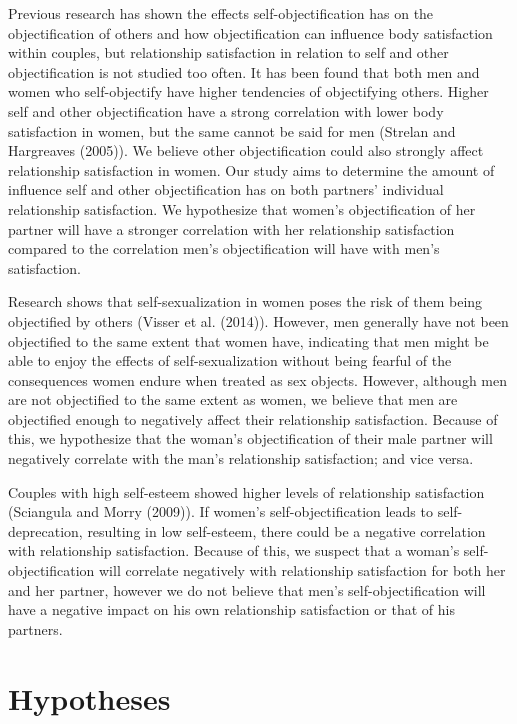 \documentclass[
  english,
  man]{apa6}
\begin{document}
Previous research has shown the effects self-objectification has on the objectification of others and how objectification can influence body satisfaction within couples, but relationship satisfaction in relation to self and other objectification is not studied too often. It has been found that both men and women who self-objectify have higher tendencies of objectifying others. Higher self and other objectification have a strong correlation with lower body satisfaction in women, but the same cannot be said for men (Strelan and Hargreaves (2005)). We believe other objectification could also strongly affect relationship satisfaction in women. Our study aims to determine the amount of influence self and other objectification has on both partners' individual relationship satisfaction. We hypothesize that women's objectification of her partner will have a stronger correlation with her relationship satisfaction compared to the correlation men's objectification will have with men's satisfaction.

Research shows that self-sexualization in women poses the risk of them being objectified by others (Visser et al. (2014)). However, men generally have not been objectified to the same extent that women have, indicating that men might be able to enjoy the effects of self-sexualization without being fearful of the consequences women endure when treated as sex objects. However, although men are not objectified to the same extent as women, we believe that men are objectified enough to negatively affect their relationship satisfaction. Because of this, we hypothesize that the woman's objectification of their male partner will negatively correlate with the man's relationship satisfaction; and vice versa.

Couples with high self-esteem showed higher levels of relationship satisfaction (Sciangula and Morry (2009)). If women's self-objectification leads to self-deprecation, resulting in low self-esteem, there could be a negative correlation with relationship satisfaction. Because of this, we suspect that a woman's self-objectification will correlate negatively with relationship satisfaction for both her and her partner, however we do not believe that men's self-objectification will have a negative impact on his own relationship satisfaction or that of his partners.

\hypertarget{hypotheses}{%
\section{Hypotheses}\label{hypotheses}}
\end{document}
